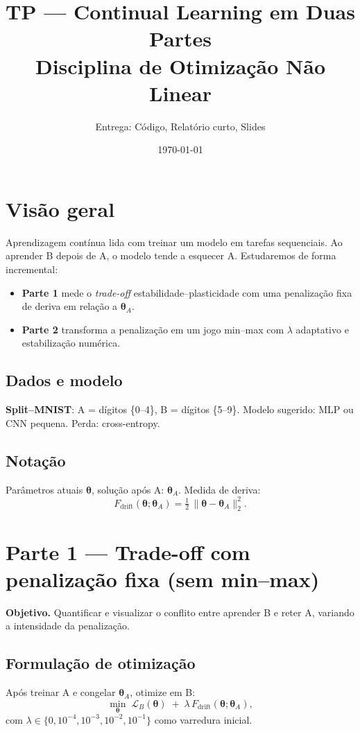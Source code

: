 \documentclass[9pt,a4paper]{extarticle}
\title{\textbf{TP — Continual Learning em Duas Partes}\\\large Disciplina de Otimização Não Linear}
\author{Entrega: Código, Relatório curto, Slides}
\date{\today}
\begin{document}
\maketitle

\section*{Visão geral}
Aprendizagem contínua lida com treinar um modelo em tarefas sequenciais. Ao aprender B depois de A, o modelo tende a esquecer A. Estudaremos de forma incremental:
\begin{itemize}
  \item \textbf{Parte 1} mede o \emph{trade-off} estabilidade–plasticidade com uma penalização fixa de deriva em relação a $\bm{\theta}_A$.
  \item \textbf{Parte 2} transforma a penalização em um jogo min–max com $\lambda$ adaptativo e estabilização numérica.
\end{itemize}

\subsection*{Dados e modelo}
\textbf{Split–MNIST}: A = dígitos \{0–4\}, B = dígitos \{5–9\}.  
Modelo sugerido: MLP ou CNN pequena. Perda: cross-entropy.

\subsection*{Notação}
Parâmetros atuais $\bm{\theta}$, solução após A: $\bm{\theta}_A$.  
Medida de deriva:
\[
F_{\text{drift}}(\bm{\theta};\bm{\theta}_A)=\tfrac{1}{2}\,\|\bm{\theta}-\bm{\theta}_A\|_2^2.
\]

\section*{Parte 1 — Trade-off com penalização fixa (sem min–max)}
\textbf{Objetivo.} Quantificar e visualizar o conflito entre aprender B e reter A, variando a intensidade da penalização.

\subsection*{Formulação de otimização}
Após treinar A e congelar $\bm{\theta}_A$, otimize em B:
\[
\min_{\bm{\theta}}\; \mathcal{L}_B(\bm{\theta}) \;+\; \lambda\,F_{\text{drift}}(\bm{\theta};\bm{\theta}_A),
\]
com $\lambda \in \{0,10^{-4},10^{-3},10^{-2},10^{-1}\}$ como varredura inicial.
\end{document}
